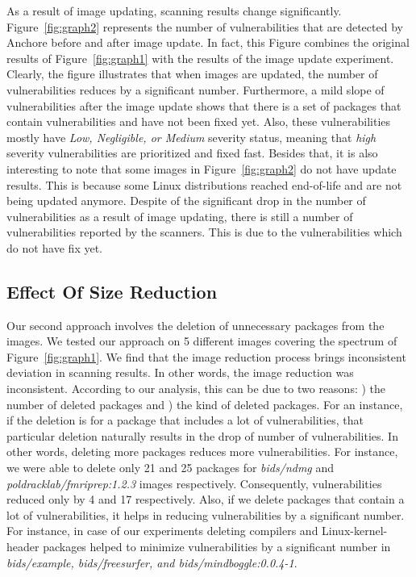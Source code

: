 \documentclass[a4paper,num-refs]{oup-contemporary}
\newcommand{\rom}[1]{\lowercase\expandafter{\romannumeral #1\relax}}
\begin{document}
As a result of image updating,
scanning results change significantly.
Figure~\ref{fig:graph2} represents the number of vulnerabilities that are detected by Anchore before and after 
image update. 
In fact, this Figure combines the original results of Figure~\ref{fig:graph1} with the results of the image update
experiment.
Clearly, the figure illustrates that when images are updated, the number of vulnerabilities reduces by a
significant number. Furthermore, a mild slope of vulnerabilities after the image update shows that
there is a set of packages that contain vulnerabilities and have not been fixed yet. Also, these
vulnerabilities mostly have \textit{Low, Negligible, or Medium} severity status, meaning that
\textit{high} severity vulnerabilities are prioritized and fixed fast.
Besides that, it is also interesting to note that some images in Figure~\ref{fig:graph2}
do not have update results. This is because some Linux distributions reached end-of-life and
are not being updated anymore.
Despite of the significant drop in the number of vulnerabilities as a result of image updating,
there is still a number of vulnerabilities reported by the scanners. This is due to the
vulnerabilities which do not have fix yet.

\subsection{Effect Of Size Reduction}

Our second approach involves the deletion of unnecessary packages from the images.
We tested our approach on 5 different images covering the spectrum of Figure~\ref{fig:graph1}.
We find that the image reduction process brings inconsistent deviation in scanning results.
In other words, the image reduction was inconsistent.
According to our analysis, this can be due to two reasons: \rom{1}) the number of
deleted packages
and \rom{2}) the kind of deleted packages. 
For an instance, if the deletion is for a package that includes a lot of vulnerabilities,
that particular deletion naturally results in the drop of number of vulnerabilities.
In other
words, deleting more packages reduces more vulnerabilities. 
For instance, we were able to delete only 21 and 25 packages for 
\textit{bids/ndmg} and \textit{poldracklab/fmriprep:1.2.3} images respectively. Consequently, vulnerabilities
reduced only by 4 and 17 respectively. 
Also, if we delete packages that contain a lot of vulnerabilities, it helps in reducing
vulnerabilities by a significant number. For instance, in case of our experiments
deleting compilers and Linux-kernel-header packages helped to minimize vulnerabilities
by a significant number in \textit{bids/example, bids/freesurfer, and bids/mindboggle:0.0.4-1}. 
\end{document}
